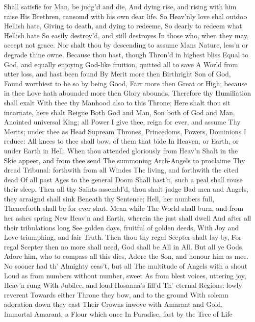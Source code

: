 \documentclass[11pt]{book}
\begin{document}
Shall satisfie for Man, be judg'd and die, 
And dying rise, and rising with him raise 
His Brethren, ransomd with his own dear life. 
So Heav'nly love shal outdoo Hellish hate, 
Giving to death, and dying to redeeme, 
So dearly to redeem what Hellish hate 
So easily destroy'd, and still destroyes 
In those who, when they may, accept not grace. 
Nor shalt thou by descending to assume 
Mans Nature, less'n or degrade thine owne. 
Because thou hast, though Thron'd in highest bliss 
Equal to God, and equally enjoying 
God-like fruition, quitted all to save 
A World from utter loss, and hast been found 
By Merit more then Birthright Son of God, 
Found worthiest to be so by being Good, 
Farr more then Great or High; because in thee 
Love hath abounded more then Glory abounds, 
Therefore thy Humiliation shall exalt 
With thee thy Manhood also to this Throne; 
Here shalt thou sit incarnate, here shalt Reigne 
Both God and Man, Son both of God and Man, 
Anointed universal King; all Power 
I give thee, reign for ever, and assume 
Thy Merits; under thee as Head Supream 
Thrones, Princedoms, Powers, Dominions I reduce: 
All knees to thee shall bow, of them that bide 
In Heaven, or Earth, or under Earth in Hell; 
When thou attended gloriously from Heav'n 
Shalt in the Skie appeer, and from thee send 
The summoning Arch-Angels to proclaime 
Thy dread Tribunal: forthwith from all Windes 
The living, and forthwith the cited dead 
Of all past Ages to the general Doom 
Shall hast'n, such a peal shall rouse their sleep. 
Then all thy Saints assembl'd, thou shalt judge 
Bad men and Angels, they arraignd shall sink 
Beneath thy Sentence; Hell, her numbers full, 
Thenceforth shall be for ever shut.  Mean while 
The World shall burn, and from her ashes spring 
New Heav'n and Earth, wherein the just shall dwell 
And after all their tribulations long 
See golden days, fruitful of golden deeds, 
With Joy and Love triumphing, and fair Truth. 
Then thou thy regal Scepter shalt lay by, 
For regal Scepter then no more shall need, 
God shall be All in All.  But all ye Gods, 
Adore him, who to compass all this dies, 
Adore the Son, and honour him as mee. 
\quad No sooner had th' Almighty ceas't, but all 
The multitude of Angels with a shout 
Loud as from numbers without number, sweet 
As from blest voices, uttering joy, Heav'n rung 
With Jubilee, and loud Hosanna's fill'd 
Th' eternal Regions: lowly reverent 
Towards either Throne they bow, and to the ground 
With solemn adoration down they cast 
Their Crowns inwove with Amarant and Gold, 
Immortal Amarant, a Flour which once 
In Paradise, fast by the Tree of Life 
\end{document}
